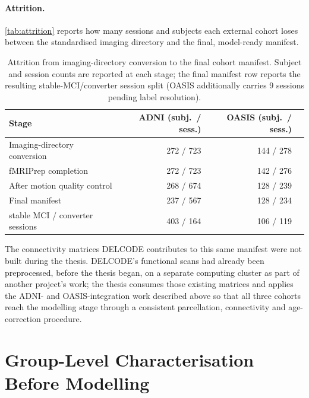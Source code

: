 \paragraph{Attrition.} \autoref{tab:attrition} reports how many sessions and subjects each
external cohort loses between the standardised imaging directory and the final,
model-ready manifest.

\begin{table}[htbp]
  \centering
  \caption{Attrition from imaging-directory conversion to the final cohort manifest.
  Subject and session counts are reported at each stage; the final manifest row
  reports the resulting stable-\ac{MCI}/converter session split (\ac{OASIS} additionally carries 9
  sessions pending label resolution).}
  \label{tab:attrition}
  \begin{tabular}{@{}lrrr@{}}
    \toprule
    Stage & \ac{ADNI} (subj.\ / sess.) & \ac{OASIS} (subj.\ / sess.) \\
    \midrule
    Imaging-directory conversion & 272 / 723 & 144 / 278 \\
    fMRIPrep completion & 272 / 723 & 142 / 276 \\
    After motion quality control & 268 / 674 & 128 / 239 \\
    Final manifest & 237 / 567 & 128 / 234 \\
    \quad stable \ac{MCI} / converter sessions & 403 / 164 & 106 / 119 \\
    \bottomrule
  \end{tabular}
\end{table}

The connectivity matrices \ac{DELCODE} contributes to this same manifest were not built
during the thesis. \ac{DELCODE}'s functional scans had already been preprocessed, before
the thesis began, on a separate computing cluster as part of another project's work; the
thesis consumes those existing matrices and applies the \ac{ADNI}- and
\ac{OASIS}-integration work described above so that all three cohorts reach the modelling
stage through a consistent parcellation, connectivity and age-correction procedure.

\section{Group-Level Characterisation Before Modelling}\label{sec:group-stats}

